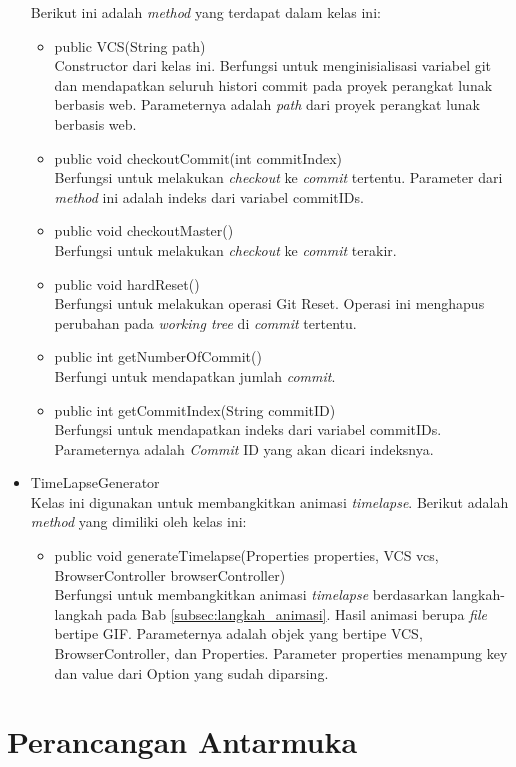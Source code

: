 \begin{itemize}
Berikut ini adalah \textit{method} yang terdapat dalam kelas ini:
\begin{itemize}
\item public VCS(String path)\\
Constructor dari kelas ini. Berfungsi untuk menginisialisasi variabel git dan mendapatkan seluruh histori commit pada proyek perangkat lunak berbasis web. Parameternya adalah \textit{path} dari proyek perangkat lunak berbasis web.
\item public void checkoutCommit(int commitIndex)\\
Berfungsi untuk melakukan \textit{checkout} ke \textit{commit} tertentu. Parameter dari \textit{method} ini adalah indeks dari variabel commitIDs.
\item public void checkoutMaster()\\
Berfungsi untuk melakukan \textit{checkout} ke \textit{commit} terakir.
\item public void hardReset()\\
Berfungsi untuk melakukan operasi Git Reset. Operasi ini menghapus perubahan pada \textit{working tree} di \textit{commit} tertentu. 
\item public int getNumberOfCommit()\\
Berfungi untuk mendapatkan jumlah \textit{commit}.
\item public int getCommitIndex(String commitID)\\
Berfungsi untuk mendapatkan indeks dari variabel commitIDs. Parameternya adalah \textit{Commit} ID yang akan dicari indeksnya.
\end{itemize}


\item TimeLapseGenerator\\
Kelas ini digunakan untuk membangkitkan animasi \textit{timelapse}.
Berikut adalah \textit{method} yang dimiliki oleh kelas ini:
\begin{itemize}
\item public void generateTimelapse(Properties properties, VCS vcs, BrowserController browserController)\\
Berfungsi untuk membangkitkan animasi \textit{timelapse} berdasarkan langkah-langkah pada Bab \ref{subsec:langkah_animasi}. Hasil animasi berupa \textit{file} bertipe GIF. Parameternya adalah objek yang bertipe VCS, BrowserController, dan Properties. Parameter properties menampung key dan value dari Option yang sudah diparsing. 
\end{itemize}

\end{itemize}

\section{Perancangan Antarmuka}
\label{sec:perancangan_antarmuka}
